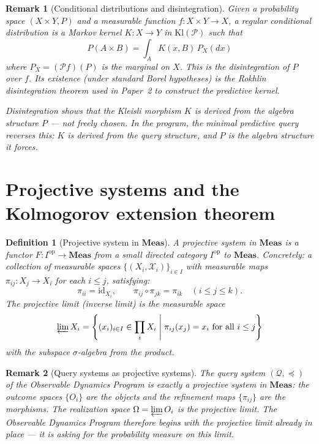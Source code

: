 \documentclass[11pt]{article}
\newtheorem{definition}{Definition}
\newtheorem{remark}{Remark}
\newcommand{\Meas}{\mathbf{Meas}}
\newcommand{\Kl}{\mathrm{Kl}}
\newcommand{\Pcal}{\mathcal{P}}
\newcommand{\Xcal}{\mathcal{X}}
\newcommand{\id}{\mathrm{id}}
\newcommand{\op}{\mathrm{op}}
\begin{document}
\begin{remark}[Conditional distributions and disintegration]
Given a probability space $(X \times Y, P)$ and a measurable function
$f : X \times Y \to X$, a \emph{regular conditional distribution} is a
Markov kernel $K : X \to Y$ in $\Kl(\Pcal)$ such that
\[
  P(A \times B) = \int_A K(x, B)\, P_X(dx)
\]
where $P_X = (\Pcal f)(P)$ is the marginal on $X$.  This is the
\emph{disintegration} of $P$ over $f$.  Its existence (under standard Borel
hypotheses) is the Rokhlin disintegration theorem used in Paper~2 to
construct the predictive kernel.

Disintegration shows that the Kleisli morphism $K$ is \emph{derived from}
the algebra structure $P$ --- not freely chosen.  In the program, the
minimal predictive query reverses this: $K$ is derived from the query
structure, and $P$ is the algebra structure it forces.
\end{remark}

\section{Projective systems and the Kolmogorov extension theorem}
\label{sec:projective}

\begin{definition}[Projective system in $\Meas$]\label{def:proj-system}
A \emph{projective system} in $\Meas$ is a functor
$F : I^\op \to \Meas$ from a small directed category $I^\op$ to $\Meas$.
Concretely: a collection of measurable spaces $\{(X_i, \Xcal_i)\}_{i \in I}$
with measurable maps $\pi_{ij} : X_j \to X_i$ for each $i \leq j$, satisfying:
\[
  \pi_{ii} = \id_{X_i}, \qquad \pi_{ij} \circ \pi_{jk} = \pi_{ik}
  \quad (i \leq j \leq k).
\]
The \emph{projective limit} (inverse limit) is the measurable space
\[
  \varprojlim X_i = \left\{ (x_i)_{i \in I} \in \prod_i X_i \;\middle|\;
  \pi_{ij}(x_j) = x_i \text{ for all } i \leq j \right\}
\]
with the subspace $\sigma$-algebra from the product.
\end{definition}

\begin{remark}[Query systems as projective systems]
The query system $(\mathcal{Q}, \preceq)$ of the Observable Dynamics Program
is exactly a projective system in $\Meas$: the outcome spaces $\{O_i\}$ are
the objects and the refinement maps $\{\pi_{ij}\}$ are the morphisms.  The
realization space $\Omega = \varprojlim O_i$ is the projective limit.  The
Observable Dynamics Program therefore begins with the projective limit
already in place --- it is asking for the probability measure on this limit.
\end{remark}
\end{document}
